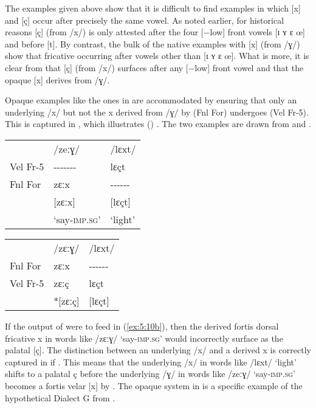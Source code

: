 The examples given above show that it is difficult to find examples in which [x] and [ç] occur after precisely the same vowel. As noted earlier, for historical reasons [ç] (from /x/) is only attested after the four [−low] front  vowels [ɪ ʏ ɛ œ] and before [t]. By contrast, the bulk of the native examples with [x] (from /ɣ/) show that fricative occurring after vowels other than [ɪ ʏ ɛ œ]. What is more, it is clear from  that [ç] (from /x/) surfaces after any [−low] front vowel and that the opaque [x] derives from /ɣ/.\largerpage

Opaque examples like the ones in  are accommodated by ensuring that only an underlying /x/ but not the {\textbar}x{\textbar} derived from /ɣ/ by  (Fnl For) undergoes  (Vel Fr-5). This is captured in , which illustrates  () .  The two examples are drawn from  and .\pagebreak

\ea%
    \label{ex:5:10}
    \begin{multicols}{2}\raggedcolumns
\ea \label{ex:5:10a}
\begin{tabular}[t]{@{} lll @{}} 
 & /zeːɣ/ & /lɛxt/\\
Vel Fr-5 & {}-{}-{}-{}-{}-{}-{}- &   lɛçt  \\  
Fnl For & zɛːx & {}-{}-{}-{}-{}-{}-      \\
        & [zɛːx] & [lɛçt]\\
& ‘say-\textsc{imp}.\textsc{sg}’  & ‘light’\\
\end{tabular}
\columnbreak
\ex\label{ex:5:10b}
\begin{tabular}[t]{@{} lll @{}} 
  &/zɛːɣ/ & /lɛxt/\\
Fnl For   & zɛːx     & {}-{}-{}-{}-{}-{}-\\
Vel Fr-5  &  zɛːç    &  lɛçt             \\
          &  *[zɛːç] &   [lɛçt]          \\
\end{tabular}
\z 
\end{multicols}
\z 

If the output of  were to feed  in (\ref{ex:5:10b}), then the derived fortis dorsal fricative {\textbar}x{\textbar} in words like /zɛːɣ/ ‘say-\textsc{imp}.\textsc{sg}’ would incorrectly surface as the palatal [ç]. The distinction between an underlying /x/ and a derived {\textbar}x{\textbar} is correctly captured in  if   . This means that the underlying /x/ in words like /lɛxt/ ‘light’ shifts to a palatal {\textbar}ç{\textbar} before the underlying /ɣ/ in words like /zeːɣ/ ‘say-\textsc{imp}.\textsc{sg}’ becomes a fortis velar [x] by . The opaque system in  is a specific example of the hypothetical Dialect G from .

